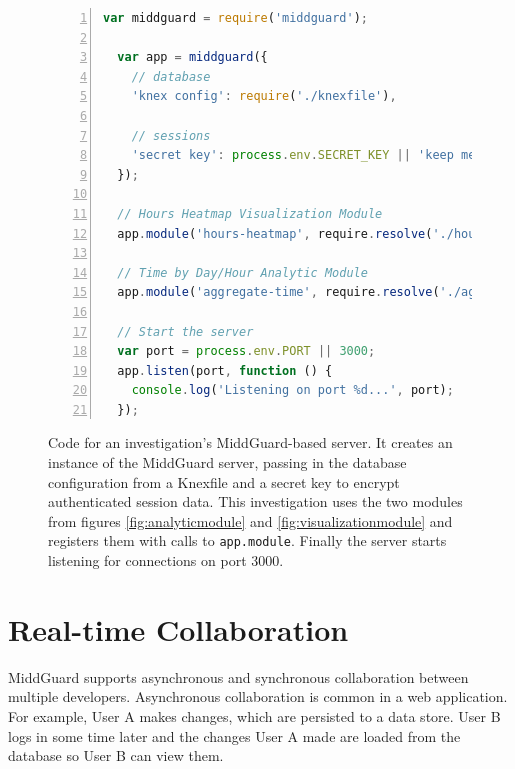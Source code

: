 \documentclass[midd]{thesis}
\begin{document}
\begin{figure}[!ht]
  \centering

  \begin{lstlisting}[numbers=left,
                     numberstyle=\footnotesize,
                     numbersep=5pt,
                     language=javascript,
                     gobble=2]
  var middguard = require('middguard');

  var app = middguard({
    // database
    'knex config': require('./knexfile'),

    // sessions
    'secret key': process.env.SECRET_KEY || 'keep me secret'
  });

  // Hours Heatmap Visualization Module
  app.module('hours-heatmap', require.resolve('./hours-heatmap'));

  // Time by Day/Hour Analytic Module
  app.module('aggregate-time', require.resolve('./aggregate-time'));

  // Start the server
  var port = process.env.PORT || 3000;
  app.listen(port, function () {
    console.log('Listening on port %d...', port);
  });
  \end{lstlisting}

  \caption[Example code for a MiddGuard-based server.]{Code for an
  investigation's MiddGuard-based server. It creates an instance of the
  MiddGuard server, passing in the database configuration from a Knexfile
  \cite{knexjs} and a secret key to encrypt authenticated session data. This
  investigation uses the two modules from figures \ref{fig:analyticmodule} and
  \ref{fig:visualizationmodule} and registers them with calls to
  \texttt{app.module}. Finally the server starts listening for connections on
  port 3000.}

  \label{fig:middguardproject}
\end{figure}

\section{Real-time Collaboration}

MiddGuard supports asynchronous and synchronous collaboration between multiple
developers. Asynchronous collaboration is common in a web application. For
example, User A makes changes, which are persisted to a data store. User B logs
in some time later and the changes User A made are loaded from the database so
User B can view them.
\end{document}
